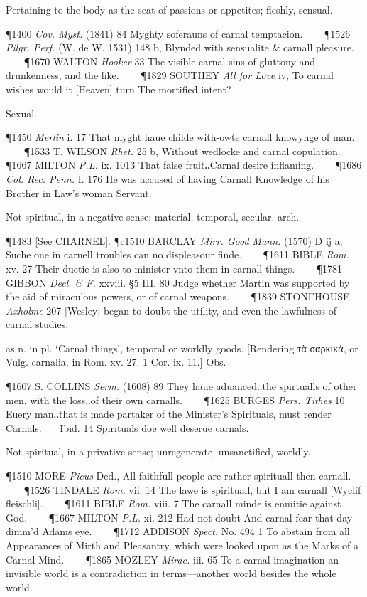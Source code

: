 \begin{description}[wide, labelwidth=!, labelindent=0pt]
\begin{myenumerate}
 Pertaining to the body as the seat of passions or appetites; fleshly, sensual.

\P 1400 \textit{Cov. Myst.} (1841) 84 Myghty soferauns of carnal temptacion.    
\P 1526 \textit{Pilgr.  Perf.} (W. de W. 1531) 148 b, Blynded with sensualite \& carnall pleasure.    
\P 1670 WALTON  \textit{Hooker} 33 The visible carnal sins of gluttony and drunkenness, and the like.    
\P 1829 SOUTHEY  \textit{All for Love} iv, To carnal wishes would it [Heaven] turn The mortified intent?

 Sexual.

\P 1450 \textit{Merlin}  i. 17 That myght haue childe with-owte carnall knowynge of man.    
\P 1533 T. WILSON  \textit{Rhet.} 25 b, Without wedlocke and carnal copulation.    
\P 1667 MILTON \textit{P.L.} ix. 1013 That  false fruit‥Carnal desire inflaming.    
\P 1686 \textit{Col. Rec. Penn.} I. 176 He was accused of having Carnall Knowledge of his Brother in Law's woman Servant.

 Not spiritual, in a negative sense; material, temporal, secular. arch.

\P 1483 [See CHARNEL].
\P c1510 BARCLAY  \textit{Mirr. Good Mann.} (1570) D ij a, Suche one in carnell troubles can no displeasour finde.    
\P 1611 BIBLE  \textit{Rom.} xv. 27 Their duetie is also to minister vnto them in carnall things.    
\P 1781 GIBBON  \textit{Decl. \& F.} xxviii. §5 III. 80 Judge whether Martin was supported by the aid of miraculous powers, or of carnal weapons.    
\P 1839 STONEHOUSE  \textit{Axholme} 207 [Wesley] began to doubt the utility, and even the lawfulness of carnal studies.

 as n. in pl. ‘Carnal things’, temporal or worldly goods. [Rendering τὰ σαρκικά, or Vulg. carnalia, in Rom. xv. 27. 1 Cor. ix. 11.] Obs.

\P 1607 S. COLLINS  \textit{Serm.} (1608) 89 They haue aduanced‥the spirtualls of other men, with the loss‥of their own carnalls.    
\P 1625 BURGES  \textit{Pers. Tithes} 10 Euery man‥that is made partaker of the Minister's Spirituals, must render Carnals.    Ibid. 14 Spirituals doe well deserue carnals.

 Not spiritual, in a privative sense; unregenerate, unsanctified, worldly.

\P 1510 MORE  \textit{Picus} Ded., All faithfull people are rather spirituall then carnall.    
\P 1526 TINDALE  \textit{Rom.} vii. 14 The lawe is spirituall, but I am carnall [Wyclif fleischli].    
\P 1611 BIBLE  \textit{Rom.} viii. 7 The carnall minde is enmitie against God.    
\P 1667 MILTON  \textit{P.L.} xi. 212 Had not doubt And carnal fear that day dimm'd Adams eye.    
\P 1712 ADDISON  \textit{Spect.} No. 494 1 To abstain from all Appearances of Mirth and Pleasantry, which were looked upon as the Marks of a Carnal Mind.    
\P 1865 MOZLEY  \textit{Mirac.} iii. 65 To a carnal imagination an invisible world is a contradiction in terms—another world besides the whole world.


\end{myenumerate}
\end{description}
